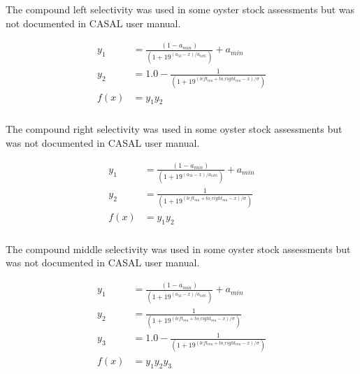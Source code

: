 \subsubsection[Compound left]{}  \label{sec:Selectivity-CompoundLeft}

The compound left selectivity was used in some oyster stock assessments but was not documented in CASAL user manual.

\begin{align*}
	y_1 & = \frac{\left(1 - a_{min}\right)}{\left(1 + 19^{(a_{50} - x)/a_{to95}}\right)}  + a_{min}\\
	y_2 & = 1.0 - \frac{1}{\left(1 + 19^{(left_{mu} + to\_right_{mu} - x)/\sigma}\right)}\\
	f(x)  &= 	y_1 y_2
\end{align*}


\subsubsection[Compound right]{}  \label{sec:Selectivity-CompoundRight}

The compound right selectivity was used in some oyster stock assessments but was not documented in CASAL user manual.

\begin{align*}
	y_1 & = \frac{\left(1 - a_{min}\right)}{\left(1 + 19^{(a_{50} - x)/a_{to95}}\right)}  + a_{min}\\
	y_2 & = \frac{1}{\left(1 + 19^{(left_{mu} + to\_right_{mu} - x)/\sigma}\right)}\\
	f(x)  &= 	y_1 y_2
\end{align*}

\subsubsection[Compound middle]{}  \label{sec:Selectivity-CompoundMidde}

The compound middle selectivity was used in some oyster stock assessments but was not documented in CASAL user manual.

\begin{align*}
	y_1 & = \frac{\left(1 - a_{min}\right)}{\left(1 + 19^{(a_{50} - x)/a_{to95}}\right)}  + a_{min}\\
	y_2 & = \frac{1}{\left(1 + 19^{(left_{mu} + to\_right_{mu} - x)/\sigma}\right)}\\
	y_3 & = 1.0 -  \frac{1}{\left(1 + 19^{(left_{mu} + to\_right_{mu} - x)/\sigma}\right)}\\
	f(x)  &= 	y_1 y_2 y_3
	\end{align*}

